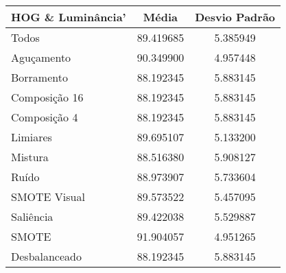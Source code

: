 

\begin{table}[!htbp]
\centering
\caption{}
\label{tab:resultados:x:melhor}
\begin{tabular}{|l|c|c|}
\hline
\textbf{HOG  \& Luminância'} & \textbf{Média}     & \textbf{Desvio Padrão} \\ \hline
   Todos        &  89.419685 &  5.385949  \\ \hline
  Aguçamento    &  90.349900 &  4.957448  \\ \hline
  Borramento    &  88.192345 &  5.883145  \\ \hline
  Composição 16 &  88.192345 &  5.883145  \\ \hline
  Composição 4  &  88.192345 &  5.883145  \\ \hline
  Limiares      &  89.695107 &  5.133200  \\ \hline
  Mistura       &  88.516380 &  5.908127  \\ \hline
  Ruído         &  88.973907 &  5.733604  \\ \hline
  SMOTE Visual  &  89.573522 &  5.457095  \\ \hline
  Saliência     &  89.422038 &  5.529887  \\ \hline
 SMOTE          &  91.904057 &  4.951265  \\ \hline
Desbalanceado   &  88.192345 &  5.883145  \\ \hline
\end{tabular}
\end{table}

